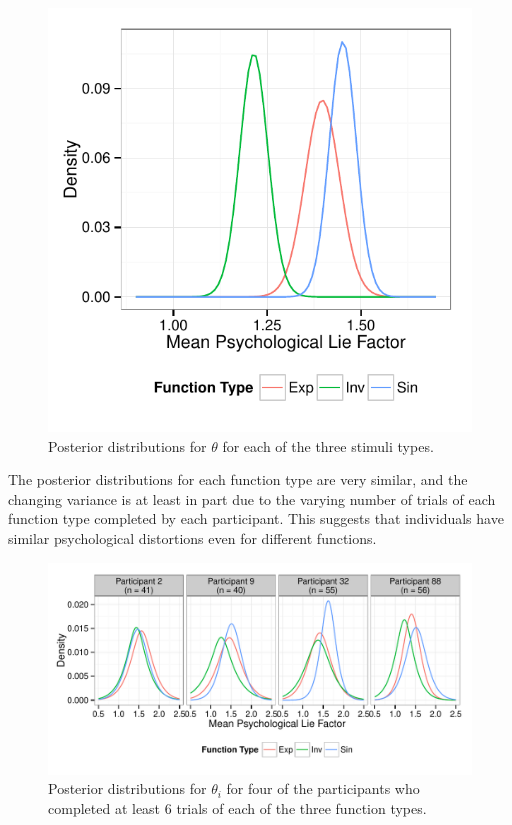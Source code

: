 \documentclass[journal]{vgtc}\usepackage{graphicx, color}
\begin{document}
\begin{figure}\centering
\includegraphics[width=\linewidth]{figure/fig-OverallMeans}
\caption{Posterior distributions for $\theta$ for each of the three stimuli types.}\label{fig:indivdensity}
\end{figure}

The posterior distributions for each function type are very similar, and the changing variance is at least in part due to the varying number of trials of each function type completed by each participant. This suggests that individuals have similar psychological distortions even for different functions. 


\begin{figure}\centering
\includegraphics[width=\linewidth]{figure/fig-IndivMeanAllFcns}
\caption{Posterior distributions for $\theta_i$ for four of the participants who completed at least 6 trials of each of the three function types.}\label{fig:indivdensity}
\end{figure}
\end{document}
